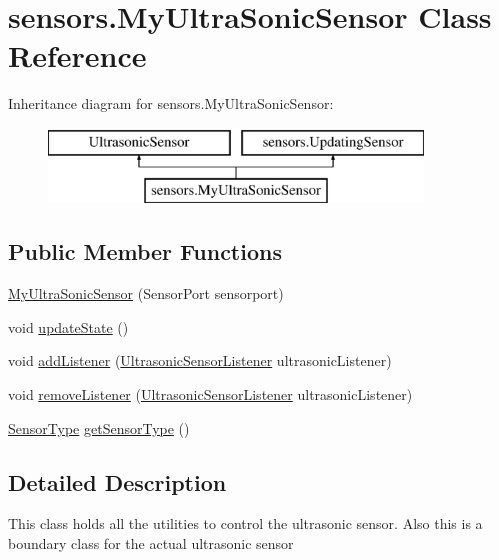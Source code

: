 \hypertarget{classsensors_1_1_my_ultra_sonic_sensor}{\section{sensors.\-My\-Ultra\-Sonic\-Sensor Class Reference}
\label{classsensors_1_1_my_ultra_sonic_sensor}
}
Inheritance diagram for sensors.\-My\-Ultra\-Sonic\-Sensor\-:\begin{figure}[H]
\begin{center}
\leavevmode
\includegraphics[height=2.000000cm]{classsensors_1_1_my_ultra_sonic_sensor}
\end{center}
\end{figure}
\subsection*{Public Member Functions}
\begin{DoxyCompactItemize}
\item 
\hyperlink{classsensors_1_1_my_ultra_sonic_sensor_a551fbaac3e8046b980afb5fcaad5ac7b}{My\-Ultra\-Sonic\-Sensor} (Sensor\-Port sensorport)
\item 
void \hyperlink{classsensors_1_1_my_ultra_sonic_sensor_a3c921c279968baa6629f9590cb5c5adc}{update\-State} ()
\item 
void \hyperlink{classsensors_1_1_my_ultra_sonic_sensor_a18264d10df33655322d6baa1e962052e}{add\-Listener} (\hyperlink{interfacesensors_1_1_ultrasonic_sensor_listener}{Ultrasonic\-Sensor\-Listener} ultrasonic\-Listener)
\item 
void \hyperlink{classsensors_1_1_my_ultra_sonic_sensor_aca8a150f651de6c00e88c6a7a0560431}{remove\-Listener} (\hyperlink{interfacesensors_1_1_ultrasonic_sensor_listener}{Ultrasonic\-Sensor\-Listener} ultrasonic\-Listener)
\item 
\hyperlink{enumsensors_1_1_sensor_type}{Sensor\-Type} \hyperlink{classsensors_1_1_my_ultra_sonic_sensor_a8ca6bc8d9caaa7bc63256bf37653bff8}{get\-Sensor\-Type} ()
\end{DoxyCompactItemize}


\subsection{Detailed Description}
This class holds all the utilities to control the ultrasonic sensor. Also this is a boundary class for the actual ultrasonic sensor

